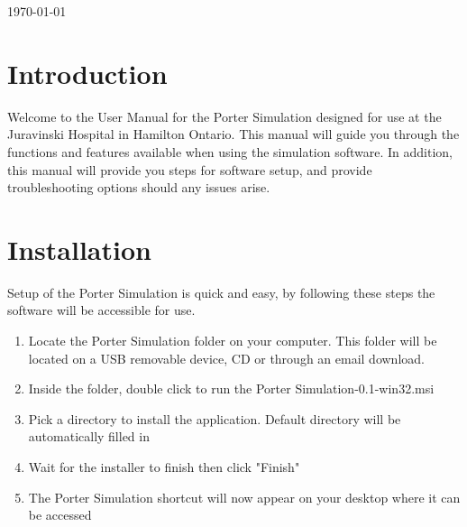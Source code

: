 \documentclass[paper=letter, fontsize=10pt]{scrartcl}
\numberwithin{equation}{section}		%
\numberwithin{figure}{section}			%
\numberwithin{table}{section}				%
\begin{document}
\begin{titlepage}
\begin{center}


{\large \today}\\[3cm] %


 

\vfill %
\end{center}
\end{titlepage}

\setcounter{tocdepth}{2}

\tableofcontents

\newpage
\section{Introduction}
Welcome to the User Manual for the Porter Simulation designed for use at the Juravinski Hospital in Hamilton Ontario. This manual will guide you through the functions and features available when using the simulation software. In addition, this manual will provide you steps for software setup, and provide troubleshooting options should any issues arise.

\section{Installation}
Setup of the Porter Simulation is quick and easy, by following these steps the software will be accessible for use.
\begin{enumerate}
	\item Locate the Porter Simulation folder on your computer. This folder will be located on a USB removable device, CD or through an email download.
	\item Inside the folder, double click to run the Porter Simulation-0.1-win32.msi
	\item Pick a directory to install the application. Default directory will be automatically filled in
	\item Wait for the installer to finish then click "Finish"
	\item The Porter Simulation shortcut will now appear on your desktop where it can be accessed
\end{enumerate}
\end{document}

